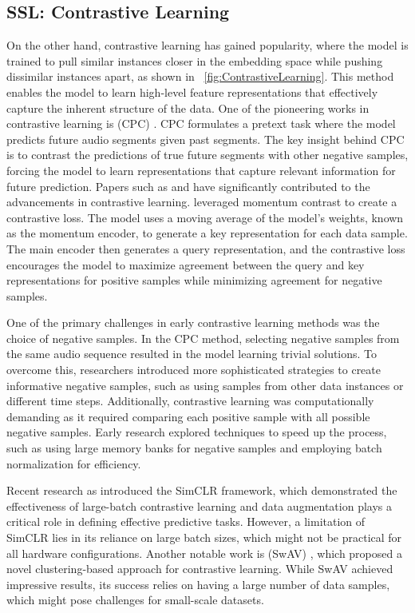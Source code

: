 \subsection{SSL: Contrastive Learning}
On the other hand, contrastive learning has gained popularity, where the model is trained to pull similar instances closer in the embedding space while pushing dissimilar instances apart, as shown in ~\ref{fig:ContrastiveLearning}. This method enables the model to learn high-level feature representations that effectively capture the inherent structure of the data. One of the pioneering works in contrastive learning is (CPC) \cite{oord2018representation}. CPC formulates a pretext task where the model predicts future audio segments given past segments. The key insight behind CPC is to contrast the predictions of true future segments with other negative samples, forcing the model to learn representations that capture relevant information for future prediction. Papers such as \cite{he2020momentum} and \cite{chen2020simple} have significantly contributed to the advancements in contrastive learning. \cite{he2020momentum} leveraged momentum contrast to create a contrastive loss. The model uses a moving average of the model's weights, known as the momentum encoder, to generate a key representation for each data sample. The main encoder then generates a query representation, and the contrastive loss encourages the model to maximize agreement between the query and key representations for positive samples while minimizing agreement for negative samples.

One of the primary challenges in early contrastive learning methods was the choice of negative samples. In the CPC method, selecting negative samples from the same audio sequence resulted in the model learning trivial solutions. To overcome this, researchers introduced more sophisticated strategies to create informative negative samples, such as using samples from other data instances or different time steps. Additionally, contrastive learning was computationally demanding as it required comparing each positive sample with all possible negative samples. Early research explored techniques to speed up the process, such as using large memory banks for negative samples and employing batch normalization for efficiency.

Recent research as \cite{chen2020simple} introduced the SimCLR framework, which demonstrated the effectiveness of large-batch contrastive learning and data augmentation plays a critical role in defining effective predictive tasks. However, a limitation of SimCLR lies in its reliance on large batch sizes, which might not be practical for all hardware configurations. Another notable work is (SwAV) \cite{caron2020unsupervised}, which proposed a novel clustering-based approach for contrastive learning. While SwAV achieved impressive results, its success relies on having a large number of data samples, which might pose challenges for small-scale datasets.

